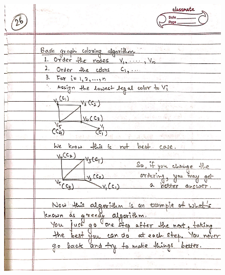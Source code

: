 \begin{figure}[H]
    \centering
    \includegraphics[width=16cm, height=21cm]{"./MIT-6.042J/MIT-6042J-026"}
\end{figure}
\newpage
